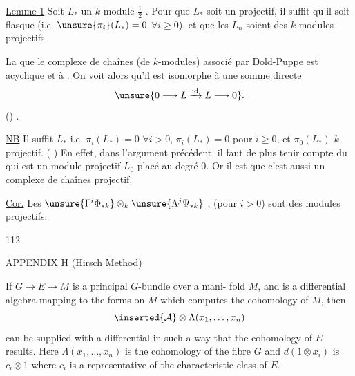 
\uline{Lemme 1} Soit $L_*$ un $k$-module $\frac12$ .
Pour que $L_*$ soit un  projectif, il suffit
qu'il soit flasque (i.e. $\unsure{\pi_i}(L_*)=0$ $\forall i\geq 0$), et que
les $L_n$ soient des $k$-modules projectifs.

La    que le complexe de
chaînes (de $k$-modules) associé par Dold-Puppe
est acyclique et à . On voit
alors qu'il est  isomorphe à une somme directe
\[
\unsure{0\longrightarrow L\xrightarrow{\mathrm{id}}L\longrightarrow 0}.
\]
  
  
   
  ()
  .

\uline{NB} Il suffit   
$L_*$  i.e. $\pi_i(L_*)=0$ $\forall i>0$, 
$\pi_i(L_*)=0$ pour $i\geq0$, et $\pi_0(L_*)$ $k$-projectif.
( 
) En effet, dans l'argument précédent,
il faut de plus tenir compte du 
 qui est un module projectif
$L_0$ placé au degré $0$. Or il est 
que c'est aussi un complexe de 
chaînes projectif.

\uline{Cor.} Les $\unsure{\Gamma^i\Phi_{* k}}\otimes_k\unsure{\Lambda^j\Psi_{* k}}$
,
(pour $i>0$) sont des
modules  projectifs.

\begin{flushright}112\end{flushright}
\begin{center}\uline{APPENDIX} \uline{H} (\uline{Hirsch Method})\end{center}

If $G\to E\to M$ is a principal $G$-bundle over a mani-
fold $M$, and  is a differential algebra mapping to the
forms on $M$ which computes the cohomology of $M$, then
\[
\inserted{\mathcal A}\otimes\Lambda(x_1,\ldots,x_n)
\]
can be supplied with a differential in such a way that
the cohomology of $E$ results. Here $\Lambda(x_1,\ldots,x_n)$ is the
cohomology of the fibre $G$ and $d(1\otimes x_i)$ is $c_i\otimes1$ where $c_i$ is
a representative of the characteristic class of $E$.

